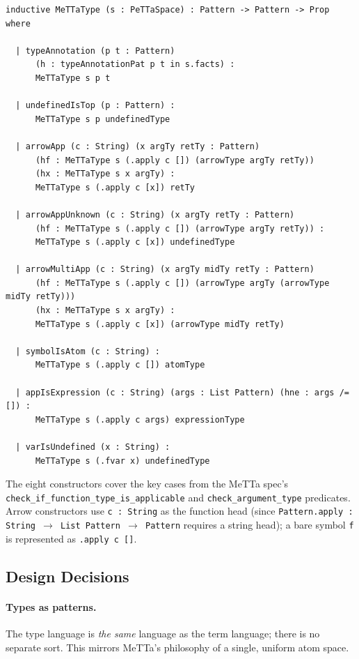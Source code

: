 \documentclass[]{article}
\newcommand{\code}[1]{\texttt{#1}}
\begin{document}
\begin{lstlisting}[language=lean]
inductive MeTTaType (s : PeTTaSpace) : Pattern -> Pattern -> Prop where

  | typeAnnotation (p t : Pattern)
      (h : typeAnnotationPat p t in s.facts) :
      MeTTaType s p t

  | undefinedIsTop (p : Pattern) :
      MeTTaType s p undefinedType

  | arrowApp (c : String) (x argTy retTy : Pattern)
      (hf : MeTTaType s (.apply c []) (arrowType argTy retTy))
      (hx : MeTTaType s x argTy) :
      MeTTaType s (.apply c [x]) retTy

  | arrowAppUnknown (c : String) (x argTy retTy : Pattern)
      (hf : MeTTaType s (.apply c []) (arrowType argTy retTy)) :
      MeTTaType s (.apply c [x]) undefinedType

  | arrowMultiApp (c : String) (x argTy midTy retTy : Pattern)
      (hf : MeTTaType s (.apply c []) (arrowType argTy (arrowType midTy retTy)))
      (hx : MeTTaType s x argTy) :
      MeTTaType s (.apply c [x]) (arrowType midTy retTy)

  | symbolIsAtom (c : String) :
      MeTTaType s (.apply c []) atomType

  | appIsExpression (c : String) (args : List Pattern) (hne : args /= []) :
      MeTTaType s (.apply c args) expressionType

  | varIsUndefined (x : String) :
      MeTTaType s (.fvar x) undefinedType
\end{lstlisting}

The eight constructors cover the key cases from the MeTTa spec's
\code{check\_if\_function\_type\_is\_applicable} and \code{check\_argument\_type}
predicates.  Arrow constructors use \code{c : String} as the function head
(since \code{Pattern.apply : String $\to$ List Pattern $\to$ Pattern} requires a
string head); a bare symbol \code{f} is represented as \code{.apply c []}.

\subsection{Design Decisions}

\paragraph{Types as patterns.}  The type language is \emph{the same} language as
the term language; there is no separate sort.  This mirrors MeTTa's philosophy of
a single, uniform atom space.
\end{document}
